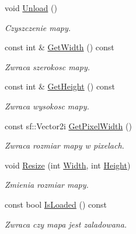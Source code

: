 \begin{DoxyCompactItemize}
void \mbox{\hyperlink{classtfp_1_1_map_a056da797998341abcb3cce036d2533cf}{Unload}} ()
\begin{DoxyCompactList}\small\item\em Czyszczenie mapy. \end{DoxyCompactList}\item 
\mbox{\label{classtfp_1_1_map_a805279d08dfe2a7ff59ab50d3e6a8870}} 
const int \& \mbox{\hyperlink{classtfp_1_1_map_a805279d08dfe2a7ff59ab50d3e6a8870}{Get\+Width}} () const
\begin{DoxyCompactList}\small\item\em Zwraca szerokosc mapy. \end{DoxyCompactList}\item 
\mbox{\label{classtfp_1_1_map_abe038a5d292ace00bd8ccaa8332b8fb1}} 
const int \& \mbox{\hyperlink{classtfp_1_1_map_abe038a5d292ace00bd8ccaa8332b8fb1}{Get\+Height}} () const
\begin{DoxyCompactList}\small\item\em Zwraca wysokosc mapy. \end{DoxyCompactList}\item 
\mbox{\label{classtfp_1_1_map_ac3a06a067ae5f14a2b199167d4383525}} 
const sf\+::\+Vector2i \mbox{\hyperlink{classtfp_1_1_map_ac3a06a067ae5f14a2b199167d4383525}{Get\+Pixel\+Width}} ()
\begin{DoxyCompactList}\small\item\em Zwraca rozmiar mapy w pixelach. \end{DoxyCompactList}\item 
void \mbox{\hyperlink{classtfp_1_1_map_af4b5ebe9c877f1f9ae2dac012ea285a0}{Resize}} (int \mbox{\hyperlink{classtfp_1_1_map_a38f784e3e3c4f02f86b161dd5f83a153}{Width}}, int \mbox{\hyperlink{classtfp_1_1_map_a4524a7be70f4b63b912a511f5b2af38c}{Height}})
\begin{DoxyCompactList}\small\item\em Zmienia rozmiar mapy. \end{DoxyCompactList}\item 
\mbox{\label{classtfp_1_1_map_a362442a982c3ce75f7de1dea92f43a40}} 
const bool \mbox{\hyperlink{classtfp_1_1_map_a362442a982c3ce75f7de1dea92f43a40}{Is\+Loaded}} () const
\begin{DoxyCompactList}\small\item\em Zwraca czy mapa jest zaladowana. \end{DoxyCompactList}\item 

\end{DoxyCompactItemize}
